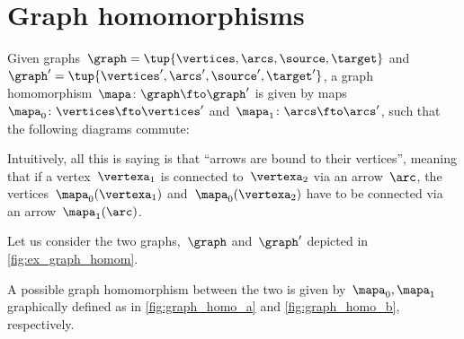 
\section{Graph homomorphisms}
\begin{definition}
    \label{def:graph_homom}
    Given graphs~$\graph=\tup{\vertices,\arcs,\source,\target}$ and~$\graph'=\tup{\vertices',\arcs',\source',\target'}$, a graph homomorphism~$\mapa \colon \graph \fto \graph'$ is given by maps~$\mapa_0\colon \vertices \fto \vertices'$ and~$\mapa_1\colon \arcs \fto \arcs'$, such that the following diagrams commute:
    \begin{center}
    \end{center}
\end{definition}
\begin{remark}
    Intuitively, all this is saying is that ``arrows are bound to their vertices'', meaning that if a vertex~$\vertexa_1$ is connected to~$\vertexa_2$ via an arrow~$\arc$, the vertices~$\mapa_0(\vertexa_1)$ and~$\mapa_0(\vertexa_2)$ have to be connected via an arrow~$\mapa_1(\arc)$.
\end{remark}

\begin{example}
    \label{exa:homomorphism_graph_positive}
    Let us consider the two graphs,~$\graph$ and~$\graph'$ depicted in \cref{fig:ex_graph_homom}.
    \begin{figure*}[h]
        \centering
        \caption{Example of graphs for graph homomorphism.}
        \label{fig:ex_graph_homom}
    \end{figure*}

    A possible graph homomorphism between the two is given by~$\mapa_0,\mapa_1$ graphically defined as
    in \cref{fig:graph_homo_a} and \cref{fig:graph_homo_b}, respectively.
\begin{marginfigure}
\begin{center}
\end{center}
\caption{\label{fig:graph_homo_a}}
\end{marginfigure}

\begin{marginfigure}
\begin{center}
\end{center}
\caption{\label{fig:graph_homo_b}}
\end{marginfigure}
\end{example}


